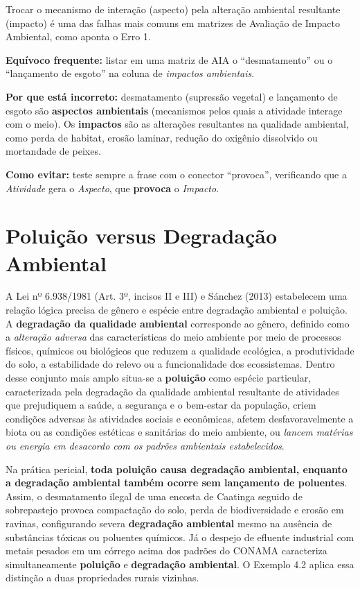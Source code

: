 Trocar o mecanismo de interação (aspecto) pela alteração ambiental resultante (impacto) é uma das falhas mais comuns em matrizes de Avaliação de Impacto Ambiental, como aponta o Erro 1.

\begin{boxErro}
\textbf{Equívoco frequente:} listar em uma matriz de AIA o ``desmatamento'' ou o ``lançamento de esgoto'' na coluna de \textit{impactos ambientais}.

\textbf{Por que está incorreto:} desmatamento (supressão vegetal) e lançamento de esgoto são \textbf{aspectos ambientais} (mecanismos pelos quais a atividade interage com o meio). Os \textbf{impactos} são as alterações resultantes na qualidade ambiental, como perda de habitat, erosão laminar, redução do oxigênio dissolvido ou mortandade de peixes.

\textbf{Como evitar:} teste sempre a frase com o conector ``provoca'', verificando que a \textit{Atividade} gera o \textit{Aspecto}, que \textbf{provoca} o \textit{Impacto}.
\end{boxErro}

\section{Poluição versus Degradação Ambiental}

A Lei nº 6.938/1981 (Art. 3º, incisos II e III) e Sánchez (2013) estabelecem uma relação lógica precisa de gênero e espécie entre degradação ambiental e poluição. A \textbf{degradação da qualidade ambiental} corresponde ao gênero, definido como a \textit{alteração adversa} das características do meio ambiente por meio de processos físicos, químicos ou biológicos que reduzem a qualidade ecológica, a produtividade do solo, a estabilidade do relevo ou a funcionalidade dos ecossistemas. Dentro desse conjunto mais amplo situa-se a \textbf{poluição} como espécie particular, caracterizada pela degradação da qualidade ambiental resultante de atividades que prejudiquem a saúde, a segurança e o bem-estar da população, criem condições adversas às atividades sociais e econômicas, afetem desfavoravelmente a biota ou as condições estéticas e sanitárias do meio ambiente, ou \textit{lancem matérias ou energia em desacordo com os padrões ambientais estabelecidos}.

Na prática pericial, \textbf{toda poluição causa degradação ambiental, enquanto a degradação ambiental também ocorre sem lançamento de poluentes}. Assim, o desmatamento ilegal de uma encosta de Caatinga seguido de sobrepastejo provoca compactação do solo, perda de biodiversidade e erosão em ravinas, configurando severa \textbf{degradação ambiental} mesmo na ausência de substâncias tóxicas ou poluentes químicos. Já o despejo de efluente industrial com metais pesados em um córrego acima dos padrões do CONAMA caracteriza simultaneamente \textbf{poluição} e \textbf{degradação ambiental}. O Exemplo 4.2 aplica essa distinção a duas propriedades rurais vizinhas.

